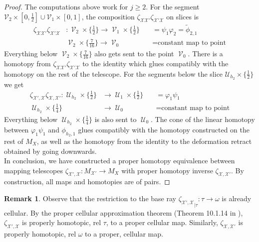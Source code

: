 \documentclass[a4paper,11pt]{article}
\theoremstyle{definition}
\newtheorem*{remark}{Remark}
\theoremstyle{plain}
\theoremstyle{remark}
\DeclareMathOperator{\V}{\mathcal{V}}
\DeclareMathOperator{\U}{\mathcal{U}}
\begin{document}
{\begin{proof}
The computations above work for $j\geq 2$. For the segment $\mathcal{V}_{2} \times [0,\frac{1}{2}]\cup \mathcal{V}_{1} \times [0,1]$, the composition $\zeta_{\mathcal{X} \mathcal{X}'}\zeta_{\mathcal{X}'\mathcal{X}}$ on slices is
\begin{align*}
\zeta_{\mathcal{X} \mathcal{X}'}\zeta_{\mathcal{X}'\mathcal{X}} &: \V_{2} \times \{\frac{1}{2}\} \rightarrow \V_{1} \times \{\frac{1}{2}\}\quad   &= \psi_{1}\varphi_{2} =\tilde{\phi}_{2,1}\\
&\V_{2} \times \{\frac{7}{16}\} \rightarrow \V_{0}  &= \text{constant map to point}
\end{align*}
Everything below $\V_{2} \times \{\frac{7}{16}\}$ also gets sent to the point $\V_{0}$. There is a homotopy from $\zeta_{\mathcal{X} \mathcal{X}'}\zeta_{\mathcal{X}'\mathcal{X}}$ to the identity which glues compatibly with the homotopy on the rest of the telescope. For the segments below the slice $\mathcal{U}_{h_{2}} \times \{\frac{1}{2}\}$ we get
\begin{align*}
\zeta_{\mathcal{X}',\mathcal{X}} \zeta_{\mathcal{X}, \mathcal{X}'}: \U_{h_{2}} \times \{\frac{1}{2}\} &\rightarrow \U_{1} \times \{\frac{1}{2}\}\quad   &= \varphi_{1}\psi_{1}\\
\U_{h_{2}} \times \{\frac{1}{4}\} &\rightarrow \U_{0}  &=  \text{constant map to point}
\end{align*}
Everything below $\U_{h_{2}} \times \{\frac{1}{4}\}$ is also sent to $\U_{0}$.
The cone of the linear homotopy between $\varphi_{1}\psi_{1}$ and $\phi_{h_2,1}$ glues compatibly with the homotopy constructed on the rest of $M_{X}$, as well as the homotopy from the identity to the deformation retract obtained by going downwards.\\

In conclusion, we have constructed a proper homotopy equivalence between mapping telescopes $\zeta_{\mathcal{X}',\mathcal{X}}: M_{\mathcal{X}'}\rightarrow M_{X}$ with proper homotopy inverse $\zeta_{\mathcal{X},\mathcal{X}'}$. By construction, all maps and homotopies are of pairs. 
\end{proof}

\begin{remark} Observe that the restriction to the base ray ${\zeta_{\mathcal{X}',\mathcal{X}}}_{|\tau}: \tau \rightarrow \omega$ is already cellular. By the proper cellular approximation theorem (Theorem 10.1.14 in \cite{geoghegan2007topological}), $\zeta_{\mathcal{X}',\mathcal{X}}$ is properly homotopic, rel $\tau$, to a proper cellular map. Similarly, $\zeta_{\mathcal{X},\mathcal{X}'}$ is properly homotopic, rel $\omega$ to a proper, cellular map. \\


\end{remark}}
\end{document}
